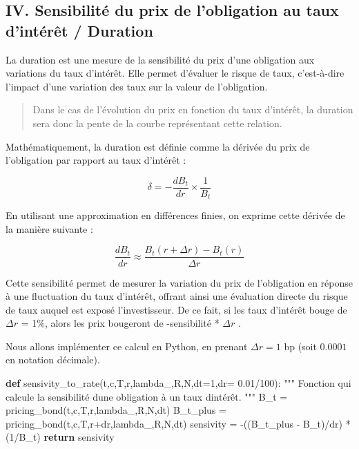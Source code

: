 \documentclass[
  letterpaper,
  DIV=11,
  numbers=noendperiod]{scrartcl}
\newenvironment{Shaded}{\begin{snugshade}}{\end{snugshade}}
\newcommand{\CommentTok}[1]{\textcolor[rgb]{0.37,0.37,0.37}{#1}}
\newcommand{\ControlFlowTok}[1]{\textcolor[rgb]{0.00,0.23,0.31}{\textbf{#1}}}
\newcommand{\DecValTok}[1]{\textcolor[rgb]{0.68,0.00,0.00}{#1}}
\newcommand{\FloatTok}[1]{\textcolor[rgb]{0.68,0.00,0.00}{#1}}
\newcommand{\KeywordTok}[1]{\textcolor[rgb]{0.00,0.23,0.31}{\textbf{#1}}}
\newcommand{\NormalTok}[1]{\textcolor[rgb]{0.00,0.23,0.31}{#1}}
\newcommand{\OperatorTok}[1]{\textcolor[rgb]{0.37,0.37,0.37}{#1}}
\begin{document}
\subsection{IV. Sensibilité du prix de l'obligation au taux d'intérêt /
Duration}\label{iv.-sensibilituxe9-du-prix-de-lobligation-au-taux-dintuxe9ruxeat-duration}

La duration est une mesure de la sensibilité du prix d'une obligation
aux variations du taux d'intérêt. Elle permet d'évaluer le risque de
taux, c'est-à-dire l'impact d'une variation des taux sur la valeur de
l'obligation.

\begin{quote}
Dans le cas de l'évolution du prix en fonction du taux d'intérêt, la
duration sera donc la pente de la courbe représentant cette relation.
\end{quote}

Mathématiquement, la duration est définie comme la dérivée du prix de
l'obligation par rapport au taux d'intérêt :

\[
\delta = - \frac{d B_t}{d r} \times \frac{1}{B_t}
\]

En utilisant une approximation en différences finies, on exprime cette
dérivée de la manière suivante :

\[
\frac{d B_t}{d r}  \approx \frac{B_t(r+\Delta r) - B_t(r)}{\Delta r}
\]

Cette sensibilité permet de mesurer la variation du prix de l'obligation
en réponse à une fluctuation du taux d'intérêt, offrant ainsi une
évaluation directe du risque de taux auquel est exposé l'investisseur.
De ce fait, si les taux d'intérêt bouge de \(\Delta r\) = 1\%, alors les
prix bougeront de -sensibilité * \(\Delta r\) .

Nous allons implémenter ce calcul en Python, en prenant \(\Delta r = 1\)
bp (soit \(0.0001\) en notation décimale).

\begin{Shaded}
\begin{Highlighting}[]
\KeywordTok{def}\NormalTok{ sensivity\_to\_rate(t,c,T,r,lambda\_,R,N,dt}\OperatorTok{=}\DecValTok{1}\NormalTok{,dr}\OperatorTok{=} \FloatTok{0.01}\OperatorTok{/}\DecValTok{100}\NormalTok{):}
    \CommentTok{"""}
\CommentTok{    Fonction qui calcule la sensibilité d\textquotesingle{}une obligation à un taux d\textquotesingle{}intérêt.}
\CommentTok{    """}
\NormalTok{    B\_t }\OperatorTok{=}\NormalTok{ pricing\_bond(t,c,T,r,lambda\_,R,N,dt)}
\NormalTok{    B\_t\_plus }\OperatorTok{=}\NormalTok{ pricing\_bond(t,c,T,r}\OperatorTok{+}\NormalTok{dr,lambda\_,R,N,dt)}
\NormalTok{    sensivity }\OperatorTok{=} \OperatorTok{{-}}\NormalTok{((B\_t\_plus }\OperatorTok{{-}}\NormalTok{ B\_t)}\OperatorTok{/}\NormalTok{dr) }\OperatorTok{*}\NormalTok{ (}\DecValTok{1}\OperatorTok{/}\NormalTok{B\_t)}
    \ControlFlowTok{return}\NormalTok{ sensivity}
\end{Highlighting}
\end{Shaded}
\end{document}
